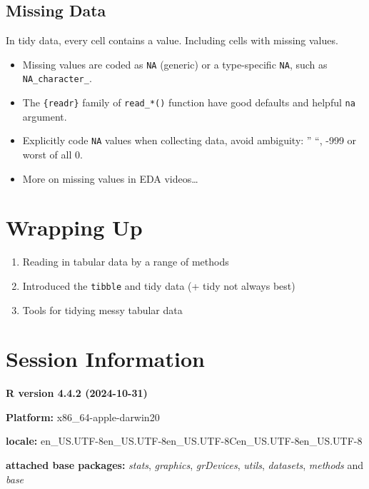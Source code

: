 \documentclass[
  letterpaper,
  DIV=11,
  numbers=noendperiod]{scrreprt}
\begin{document}
\subsection{Missing Data}\label{missing-data}

In tidy data, every cell contains a value. Including cells with missing
values.

\begin{itemize}
\item
  Missing values are coded as \texttt{NA} (generic) or a type-specific
  \texttt{NA}, such as \texttt{NA\_character\_}.
\item
  The \texttt{\{readr\}} family of \texttt{read\_*()} function have good
  defaults and helpful \texttt{na} argument.
\item
  Explicitly code \texttt{NA} values when collecting data, avoid
  ambiguity: '' ``, -999 or worst of all 0.
\item
  More on missing values in EDA videos\ldots{}
\end{itemize}

\section{Wrapping Up}\label{wrapping-up-1}

\begin{enumerate}
\def\labelenumi{\arabic{enumi}.}
\item
  Reading in tabular data by a range of methods
\item
  Introduced the \texttt{tibble} and tidy data (+ tidy not always best)
\item
  Tools for tidying messy tabular data
\end{enumerate}

\section{Session Information}\label{session-information-3}

\textbf{R version 4.4.2 (2024-10-31)}

\textbf{Platform:} x86\_64-apple-darwin20

\textbf{locale:}
en\_US.UTF-8\textbar\textbar en\_US.UTF-8\textbar\textbar en\_US.UTF-8\textbar\textbar C\textbar\textbar en\_US.UTF-8\textbar\textbar en\_US.UTF-8

\textbf{attached base packages:} \emph{stats}, \emph{graphics},
\emph{grDevices}, \emph{utils}, \emph{datasets}, \emph{methods} and
\emph{base}
\end{document}
